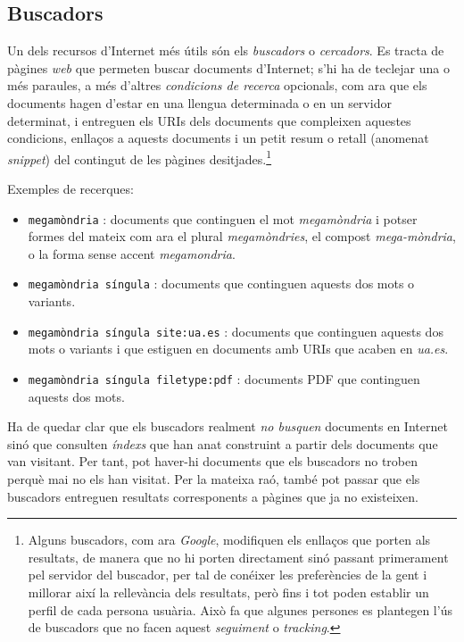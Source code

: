 \subsection{Buscadors}

Un dels recursos d'Internet més útils són els \emph{buscadors} o
\emph{cercadors}. Es tracta de pàgines \emph{web} que permeten buscar
documents d'Internet; s'hi ha de teclejar una o més paraules, a més
d'altres \emph{condicions de recerca} opcionals, com ara que els
documents hagen d'estar en una llengua determinada o en un servidor
determinat, i entreguen els URIs dels documents que compleixen
aquestes condicions, enllaços a aquests documents i un petit resum o
retall (anomenat \emph{snippet}) del contingut de les pàgines
desitjades.\footnote{Alguns buscadors, com ara \emph{Google},
  modifiquen els enllaços que porten als resultats, de manera que no
  hi porten directament sinó passant primerament pel servidor del
  buscador, per tal de conéixer les preferències de la gent i millorar
  així la rellevància dels resultats, però fins i tot poden establir
  un perfil de cada persona usuària. Això fa que algunes persones es
  plantegen l'ús de buscadors que no facen aquest \emph{seguiment} o
  \emph{tracking}.}

Exemples de recerques:
\begin{itemize}
\item \texttt{megamòndria} : documents que continguen el mot \emph{megamòndria} i potser formes del mateix com ara el plural \emph{megamòndries}, el compost \emph{mega-mòndria}, o la forma sense accent \emph{megamondria}.
\item \texttt{megamòndria síngula} : documents que continguen aquests dos mots o variants.
\item \texttt{megamòndria síngula site:ua.es} : documents que
continguen aquests dos mots o variants i que estiguen en documents amb
URIs que acaben en \emph{ua.es}.
\item \texttt{megamòndria síngula filetype:pdf} : documents PDF que continguen aquests dos mots.
\end{itemize}

Ha de quedar clar que els buscadors realment \emph{no busquen}
documents en Internet sinó que consulten \emph{índexs} que han anat
construint a partir dels documents que van visitant. Per tant, pot
haver-hi documents que els buscadors no troben perquè mai no els han
visitat. Per la mateixa raó, també pot passar que els buscadors
entreguen resultats corresponents a pàgines que ja no existeixen.

